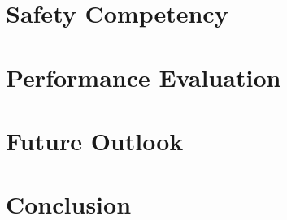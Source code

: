 \documentclass[a4paper, 12pt, oneside, BCOR1cm,toc=chapterentrywithdots]{scrbook}
\begin{document}
\chapter{Safety Competency}
\chapter{Performance Evaluation}
\chapter{Future Outlook}
\chapter{Conclusion}



\end{document}
